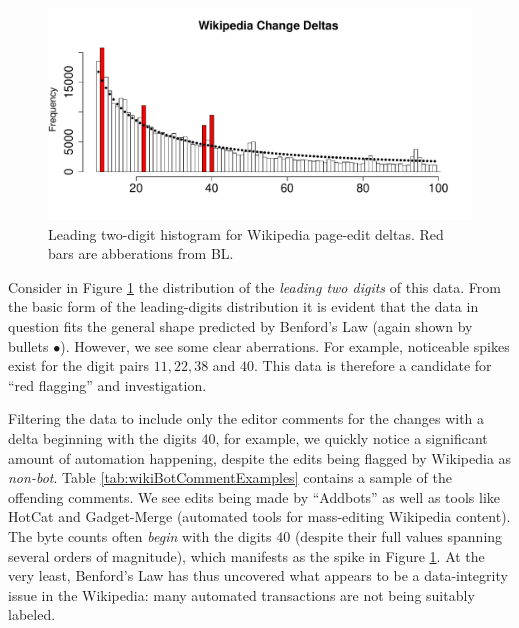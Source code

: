 \documentclass[twoside,leqno,twocolumn]{article}\usepackage[]{graphicx}\usepackage[]{color}
\makeatletter
\def\maxwidth{ %
  \ifdim\Gin@nat@width>\linewidth
    \linewidth
  \else
    \Gin@nat@width
  \fi
}
\newenvironment{knitrout}{}{} %
\makeatother
\begin{document}

\begin{knitrout}
\color{fgcolor}\begin{figure}[h!]
\includegraphics[width=\maxwidth]{figure/wikipedia-data-digits-histogram-1} \caption[Leading two-digit histogram for Wikipedia page-edit deltas]{Leading two-digit histogram for Wikipedia page-edit deltas. Red bars are abberations from BL.}\label{fig:wikipedia-data-digits-histogram}
\end{figure}


\end{knitrout}

Consider in Figure \ref{fig:wikipedia-data-digits-histogram} the distribution of the \textit{leading two digits} of this data. From the basic form of the leading-digits distribution it is evident that the data in question fits the general shape predicted by Benford's Law (again shown by bullets $\bullet$). However, we see some clear aberrations. For example, noticeable spikes exist for the digit pairs $11, 22, 38$ and $40$. This data is therefore a candidate for ``red flagging'' and investigation.

Filtering the data to include only the editor comments for the changes with a delta beginning with the digits $40$, for example, we quickly notice a significant amount of automation happening, despite the edits being flagged by Wikipedia as \textit{non-bot}. Table \ref{tab:wikiBotCommentExamples} contains a sample of the offending comments. We see edits being made by ``Addbots'' as well as tools like HotCat and Gadget-Merge (automated tools for mass-editing Wikipedia content). The byte counts often \textit{begin} with the digits $40$ (despite their full values spanning several orders of magnitude), which manifests as the spike in Figure \ref{fig:wikipedia-data-digits-histogram}. At the very least, Benford's Law has thus uncovered what appears to be a data-integrity issue in the Wikipedia: many automated transactions are not being suitably labeled.
\end{document}
